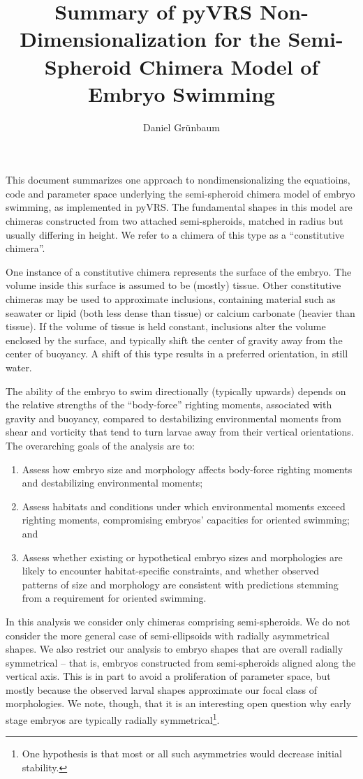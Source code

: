 \documentclass[10pt,a4paper]{article}
\title{Summary of pyVRS Non-Dimensionalization for the Semi-Spheroid Chimera Model of Embryo Swimming}
\author{Daniel Gr\"unbaum}
\begin{document}
\maketitle
This document summarizes one approach to nondimensionalizing the equatioins, code and parameter space underlying the semi-spheroid chimera model of embryo swimming, as implemented in pyVRS. 
The fundamental shapes in this model are chimeras constructed from two attached semi-spheroids, matched in radius but usually differing in height. 
We refer to a chimera of this type as a ``constitutive chimera''.

One instance of a constitutive chimera represents the surface of the embryo.
The volume inside this surface is assumed to be (mostly) tissue. 
Other constitutive chimeras may be used to approximate inclusions, containing material such as seawater or lipid (both less dense than tissue) or calcium carbonate (heavier than tissue).
If the volume of tissue is held constant, inclusions alter the volume enclosed by the surface, and typically shift the center of gravity away from the center of buoyancy.
A shift of this type results in a preferred orientation, in still water.

The ability of the embryo to swim directionally (typically upwards) depends on the relative strengths of the ``body-force'' righting moments, associated with gravity and buoyancy, compared to destabilizing environmental moments from shear and vorticity that tend to turn larvae away from their vertical orientations.
The overarching goals of the analysis are to:
\begin{enumerate}
	\item Assess how embryo size and morphology affects body-force righting moments and destabilizing environmental moments; 
	\item Assess habitats and conditions under which environmental moments exceed righting moments, compromising embryos' capacities for oriented swimming; and 
	\item Assess whether existing or hypothetical embryo sizes and morphologies are likely to encounter habitat-specific constraints, and whether observed patterns of size and morphology are consistent with predictions stemming from a requirement for oriented swimming.
\end{enumerate}
In this analysis we consider only chimeras comprising semi-spheroids.
We do not consider the more general case of semi-ellipsoids with radially asymmetrical shapes.
We also restrict our analysis to embryo shapes that are overall radially symmetrical -- that is, embryos constructed from semi-spheroids aligned along the vertical axis. 
This is in part to avoid a proliferation of parameter space, but mostly because the observed larval shapes approximate our focal class of morphologies. 
We note, though, that it is an interesting open question why early stage embryos are typically radially symmetrical\footnote{One hypothesis is that most or all such asymmetries would decrease initial stability.}. 
\end{document}
